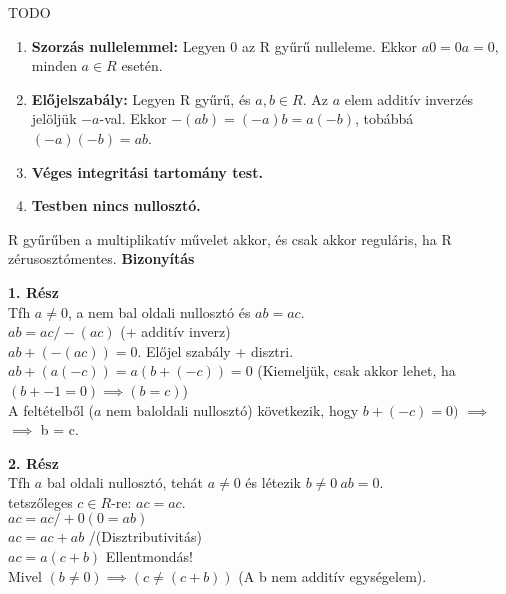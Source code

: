 \begin{frame}
\begin{tcolorbox}[title={Algebrai struktúrák kpacsolata (Kép)}]
TODO
\end{tcolorbox}
\end{frame}

\begin{frame}
  \begin{tcolorbox}[title={Lemma: Észrevételek gyűrűkben}]
    \begin{enumerate}
      \item \textbf{Szorzás nullelemmel:} Legyen 0 az R gyűrű nulleleme. Ekkor $a0 = 0a = 0$, minden $a \in R$ esetén.
      \item \textbf{Előjelszabály:} Legyen R gyűrű, és $a, b \in R$. Az $a$ elem additív inverzés jelöljük $-a$-val. Ekkor $-(ab) = (-a)b = a(-b)$, tobábbá $(-a)(-b) = ab$.
      \item \textbf{Véges integritási tartomány test.}
      \item \textbf{Testben nincs nullosztó.}
    \end{enumerate}
  \end{tcolorbox}
\end{frame}

\begin{frame}
  \begin{tcolorbox}[title={Lemma: Nullosztó és regularitás}]
    R gyűrűben a multiplikatív művelet akkor, és csak akkor reguláris, ha R zérusosztómentes.
  \tcblower
    \textbf{Bizonyítás}\\
    \mmedskip

    \textbf{1. Rész}\\
    Tfh $a \neq 0$, a nem bal oldali nullosztó és $ab = ac$.\\
    $ab = ac  / -(ac)$ (+ additív inverz)\\
    $ab + (-(ac)) = 0$. Előjel szabály + disztri.\\
    $ab + (a(-c)) = a(b+(-c)) = 0$ (Kiemeljük, csak akkor lehet, ha $(b + -1 = 0) \implies (b = c)$)\\
    A feltételből ($a$ nem baloldali nullosztó) következik, hogy $b + (-c) = 0)$ $\implies$\\
    $\implies$ b = c.\\
    \bigskip

    \textbf{2. Rész}\\
    Tfh $a$ bal oldali nullosztó, tehát $a \neq 0$ és létezik $b \neq 0\: ab = 0$.\\
    tetszőleges $c \in R$-re: $ac = ac$.\\
    $ac = ac / +0 (0 = ab)$\\
    $ac = ac + ab$ /(Disztributivitás)\\
    $ac = a(c + b)$ Ellentmondás!\\
    Mivel $(b \neq 0) \implies (c \neq (c + b))$ (A b nem additív egységelem).
  \end{tcolorbox}
\end{frame}

